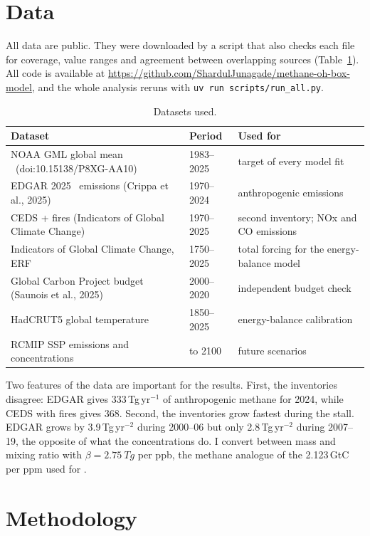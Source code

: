 \documentclass[11pt,a4paper]{article}
\newcommand{\CH}{\ce{CH4}}
\begin{document}
\section{Data}

All data are public. They were downloaded by a script that also checks each file for coverage, value ranges and agreement between overlapping sources (Table~\ref{tab:data}). All code is available at \url{https://github.com/ShardulJunagade/methane-oh-box-model}, and the whole analysis reruns with \texttt{uv run scripts/run\_all.py}.

\begin{table}[h]
\centering\small
\caption{Datasets used.}
\label{tab:data}
\begin{tabular}{>{\raggedright\arraybackslash}p{6.0cm}p{2.6cm}>{\raggedright\arraybackslash}p{6.0cm}}
\toprule
Dataset & Period & Used for\\
\midrule
NOAA GML global mean \CH\ (doi:10.15138/P8XG-AA10) & 1983--2025 & target of every model fit\\
EDGAR 2025 \CH\ emissions (Crippa et al., 2025) & 1970--2024 & anthropogenic emissions\\
CEDS + fires (Indicators of Global Climate Change) & 1970--2025 & second inventory; NOx and CO emissions\\
Indicators of Global Climate Change, ERF & 1750--2025 & total forcing for the energy-balance model\\
Global Carbon Project budget (Saunois et al., 2025) & 2000--2020 & independent budget check\\
HadCRUT5 global temperature & 1850--2025 & energy-balance calibration\\
RCMIP SSP emissions and concentrations & to 2100 & future scenarios\\
\bottomrule
\end{tabular}
\end{table}

Two features of the data are important for the results. First, the inventories disagree: EDGAR gives 333\,Tg\,yr$^{-1}$ of anthropogenic methane for 2024, while CEDS with fires gives 368. Second, the inventories grow fastest during the stall. EDGAR grows by 3.9\,Tg\,yr$^{-2}$ during 2000--06 but only 2.8\,Tg\,yr$^{-2}$ during 2007--19, the opposite of what the concentrations do. I convert between mass and mixing ratio with $\beta=\SI{2.75}{Tg}$ per ppb, the methane analogue of the 2.123\,GtC per ppm used for .

\section{Methodology}
\end{document}
